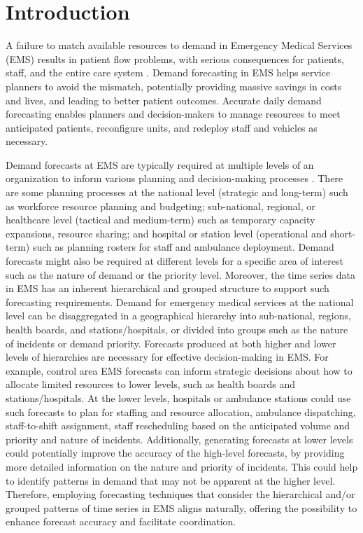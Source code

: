 \documentclass[
  authoryear,
  preprint,
  3p]{elsarticle}
\begin{document}
\hypertarget{sec-intro}{%
\section{Introduction}\label{sec-intro}}

A failure to match available resources to demand in Emergency Medical
Services (EMS) results in patient flow problems, with serious
consequences for patients, staff, and the entire care system
\citep{ekstrom2015forecasting, ROSTAMITABAR20221197}. Demand forecasting
in EMS helps service planners to avoid the mismatch, potentially
providing massive savings in costs and lives, and leading to better
patient outcomes. Accurate daily demand forecasting enables planners and
decision-makers to manage resources to meet anticipated patients,
reconfigure units, and redeploy staff and vehicles as necessary.

Demand forecasts at EMS are typically required at multiple levels of an
organization to inform various planning and decision-making processes
\citep{hulshof2012taxonomic}. There are some planning processes at the
national level (strategic and long-term) such as workforce resource
planning and budgeting; sub-national, regional, or healthcare level
(tactical and medium-term) such as temporary capacity expansions,
resource sharing; and hospital or station level (operational and
short-term) such as planning rosters for staff and ambulance deployment.
Demand forecasts might also be required at different levels for a
specific area of interest such as the nature of demand or the priority
level. Moreover, the time series data in EMS has an inherent
hierarchical and grouped structure to support such forecasting
requirements. Demand for emergency medical services at the national
level can be disaggregated in a geographical hierarchy into
sub-national, regions, health boards, and stations/hospitals, or divided
into groups such as the nature of incidents or demand priority.
Forecasts produced at both higher and lower levels of hierarchies are
necessary for effective decision-making in EMS. For example, control
area EMS forecasts can inform strategic decisions about how to allocate
limited resources to lower levels, such as health boards and
stations/hospitals. At the lower levels, hospitals or ambulance stations
could use such forecasts to plan for staffing and resource allocation,
ambulance dispatching, staff-to-shift assignment, staff rescheduling
based on the anticipated volume and priority and nature of incidents.
Additionally, generating forecasts at lower levels could potentially
improve the accuracy of the high-level forecasts, by providing more
detailed information on the nature and priority of incidents. This could
help to identify patterns in demand that may not be apparent at the
higher level. Therefore, employing forecasting techniques that consider
the hierarchical and/or grouped patterns of time series in EMS aligns
naturally, offering the possibility to enhance forecast accuracy and
facilitate coordination.
\end{document}
